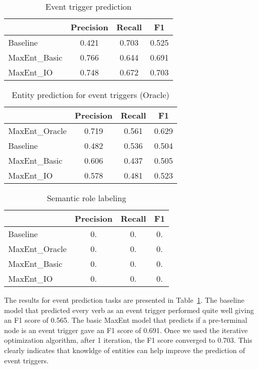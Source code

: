 
\begin{table}
\centering
\begin{tabular}{|l||c|c|c|} \hline
&\textbf{Precision} & \textbf{Recall} & \textbf{F1} \\ \hline
\hline
Baseline& 0.421 & 0.703 &0.525\\
MaxEnt\_Basic& 0.766 & 0.644&  0.691 \\
MaxEnt\_IO&0.748&0.672&0.703\\
\hline
\end{tabular}
\caption{Event trigger prediction}
\label{table:eventprediction}
\end{table}

\begin{table}
\centering
\begin{tabular}{|l||c|c|c|} \hline
&\textbf{Precision} & \textbf{Recall} & \textbf{F1} \\ \hline
\hline
MaxEnt\_Oracle&0.719&0.561&0.629\\
Baseline&0.482&0.536&0.504\\
MaxEnt\_Basic&0.606&0.437&0.505\\
MaxEnt\_IO&0.578&0.481&0.523\\
\hline
\end{tabular}
\caption{Entity prediction for event triggers (Oracle)}
\label{table:entityprediction}
\end{table}

\begin{table}
\centering
\begin{tabular}{|l||c|c|c|} \hline
&\textbf{Precision} & \textbf{Recall} & \textbf{F1} \\ \hline
\hline
Baseline&0.&0.&0.\\
MaxEnt\_Oracle&0.&0.&0.\\
MaxEnt\_Basic&0.&0.&0.\\
MaxEnt\_IO&0.&0.&0.\\
\hline
\end{tabular}
\caption{Semantic role labeling}
\label{table:srlprediction}
\end{table}

The results for event prediction tasks are presented in Table~\ref{table:eventprediction}. The baseline model that predicted every verb as an event trigger performed quite well giving an F1 score of 0.565. The basic MaxEnt model that predicts if a pre-terminal node is an event trigger gave an F1 score of 0.691. Once we used the iterative optimization algorithm, after 1 iteration, the F1 score converged to 0.703. This clearly indicates that knowldge of entities can help improve the prediction of event triggers.

